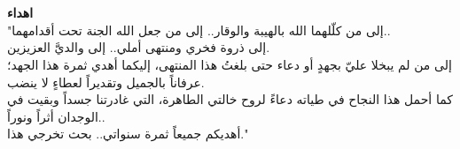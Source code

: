 \chapter*{}
\vfill
\begin{center}
	\large\amirifont
	\textbf{اهداء}\\[10pt]
	"إلى من كلّلهما الله بالهيبة والوقار.. إلى من جعل الله الجنة تحت أقدامهما..\\
	إلى ذروة فخري ومنتهى أملي.. إلى والديَّ العزيزين.\\
	إلى من لم يبخلا عليّ بجهدٍ أو دعاء حتى بلغتُ هذا المنتهى، إليكما أهدي ثمرة هذا الجهد؛ عرفاناً بالجميل وتقديراً لعطاءٍ لا ينضب.\\
	كما أحمل هذا النجاح في طياته دعاءً لروح خالتي الطاهرة، التي غادرتنا جسداً وبقيت في الوجدان أثراً ونوراً..\\
	أهديكم جميعاً ثمرة سنواتي.. بحث تخرجي هذا."
\end{center}
\vfill